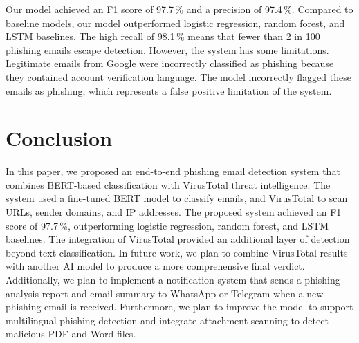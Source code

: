 \documentclass[conference]{IEEEtran}
\begin{document}
Our model achieved an F1 score of 97.7\,\% and a precision of
97.4\,\%. Compared to baseline models, our model outperformed
logistic regression, random forest, and LSTM baselines. The high
recall of 98.1\,\% means that fewer than 2 in 100 phishing emails
escape detection. However, the system has some limitations.
Legitimate emails from Google were incorrectly classified as
phishing because they contained account verification language. The
model incorrectly flagged these emails as phishing, which
represents a false positive limitation of the system.

\section{Conclusion}
\label{sec:conclusion}

In this paper, we proposed an end-to-end phishing email detection
system that combines BERT-based classification with VirusTotal
threat intelligence. The system used a fine-tuned BERT model to
classify emails, and VirusTotal to scan URLs, sender domains, and
IP addresses. The proposed system achieved an F1 score of
97.7\,\%, outperforming logistic regression, random forest, and
LSTM baselines. The integration of VirusTotal provided an
additional layer of detection beyond text classification. In future
work, we plan to combine VirusTotal results with another AI model
to produce a more comprehensive final verdict. Additionally, we
plan to implement a notification system that sends a phishing
analysis report and email summary to WhatsApp or Telegram when a
new phishing email is received. Furthermore, we plan to improve
the model to support multilingual phishing detection and integrate
attachment scanning to detect malicious PDF and Word files.
\end{document}
